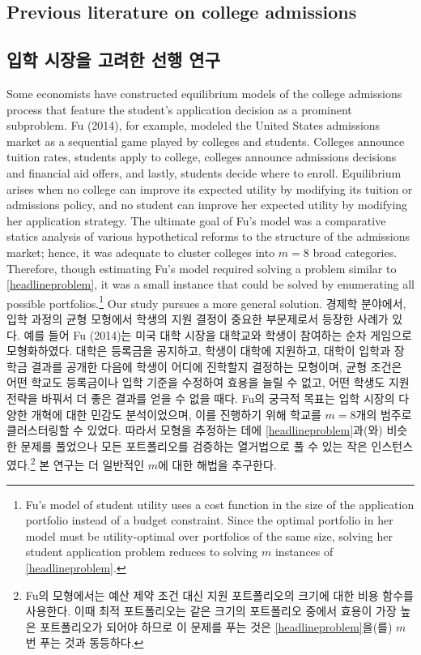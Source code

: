 \documentclass[11pt]{article} %
\theoremstyle{definition}
\theoremstyle{definition}
\begin{document}
\ifen \subsection{Previous literature on college admissions} \else \subsection{입학 시장을 고려한 선행 연구}\fi
\ifen
Some economists have constructed equilibrium models of the college admissions process that feature the student's application decision as a prominent subproblem. Fu (2014), for example, modeled the United States admissions market as a sequential game played by colleges and students. Colleges announce tuition rates, students apply to college, colleges announce admissions decisions and financial aid offers, and lastly, students decide where to enroll. Equilibrium arises when no college can improve its expected utility by modifying its tuition or admissions policy, and no student can improve her expected utility by modifying her application strategy. The ultimate goal of Fu's model was a comparative statics analysis of various hypothetical reforms to the structure of the admissions market; hence, it was adequate to cluster colleges into $m=8$ broad categories. Therefore, though estimating Fu's model required solving a problem similar to \eqref{headlineproblem}, it was a small instance that could be solved by enumerating all possible portfolios.\footnote{Fu's model of student utility uses a cost function in the size of the application portfolio instead of a budget constraint. Since the optimal portfolio in her model must be utility-optimal over portfolios of the same size, solving her student application problem reduces to solving $m$ instances of \eqref{headlineproblem}.} Our study pursues a more general solution.
\else
경제학 분야에서, 입학 과정의 균형 모형에서 학생의 지원 결정이 중요한 부문제로서 등장한 사례가 있다. 예를 들어 Fu (2014)는 미국 대학 시장을 대학교와 학생이 참여하는 순차 게임으로 모형화하였다. 대학은 등록금을 공지하고, 학생이 대학에 지원하고, 대학이 입학과 장학금 결과를 공개한 다음에 학생이 어디에 진학할지 결정하는 모형이며, 균형 조건은 어떤 학교도 등록금이나 입학 기준을 수정하여 효용을 늘릴 수 없고, 어떤 학생도 지원 전략을 바꿔서 더 좋은 결과를 얻을 수 없을 때다. Fu의 궁극적 목표는 입학 시장의 다양한 개혁에 대한 민감도 분석이었으며, 이를 진행하기 위해 학교를 $m=8$개의 범주로 클러스터링할 수 있었다. 따라서 모형을 추정하는 데에 \eqref{headlineproblem}과(와) 비슷한 문제를 풀었으나 모든 포트폴리오를 검증하는 열거법으로 풀 수 있는 작은 인스턴스였다.\footnote{Fu의 모형에서는 예산 제약 조건 대신 지원 포트폴리오의 크기에 대한 비용 함수를 사용한다. 이때 최적 포트폴리오는 같은 크기의 포트폴리오 중에서 효용이 가장 높은 포트폴리오가 되어야 하므로 이 문제를 푸는 것은 \eqref{headlineproblem}을(를) $m$번 푸는 것과 동등하다.} 본 연구는 더 일반적인 $m$에 대한 해법을 추구한다.
\fi
\end{document}
